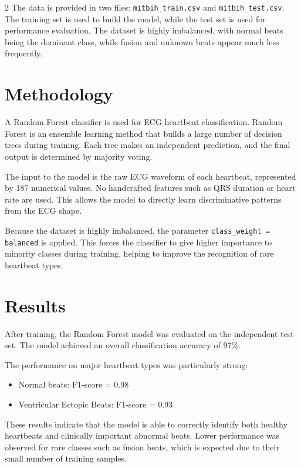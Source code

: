 \documentclass[a4paper,10pt]{article}
\begin{document}
\begin{multicols}{2}
The data is provided in two files: \texttt{mitbih\_train.csv} and \texttt{mitbih\_test.csv}. The training set is used to build the model, while the test set is used for performance evaluation. The dataset is highly imbalanced, with normal beats being the dominant class, while fusion and unknown beats appear much less frequently.

\section{Methodology}

A Random Forest classifier is used for ECG heartbeat classification. Random Forest is an ensemble learning method that builds a large number of decision trees during training. Each tree makes an independent prediction, and the final output is determined by majority voting.

The input to the model is the raw ECG waveform of each heartbeat, represented by 187 numerical values. No handcrafted features such as QRS duration or heart rate are used. This allows the model to directly learn discriminative patterns from the ECG shape.

Because the dataset is highly imbalanced, the parameter \texttt{class\_weight = balanced} is applied. This forces the classifier to give higher importance to minority classes during training, helping to improve the recognition of rare heartbeat types.

\section{Results}

After training, the Random Forest model was evaluated on the independent test set. The model achieved an overall classification accuracy of 97\%.

The performance on major heartbeat types was particularly strong:
\begin{itemize}
    \item Normal beats: F1-score = 0.98
    \item Ventricular Ectopic Beats: F1-score = 0.93
\end{itemize}

These results indicate that the model is able to correctly identify both healthy heartbeats and clinically important abnormal beats. Lower performance was observed for rare classes such as fusion beats, which is expected due to their small number of training samples.


\end{multicols}
\end{document}
